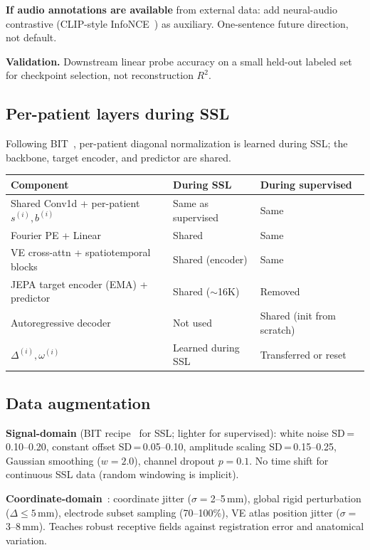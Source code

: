 \documentclass[11pt,letterpaper]{article}
\begin{document}
\textbf{If audio annotations are available} from external data: add neural-audio contrastive (CLIP-style InfoNCE~\cite{antoniades2024}) as auxiliary. One-sentence future direction, not default.

\textbf{Validation.} Downstream linear probe accuracy on a small held-out labeled set for checkpoint selection, not reconstruction $R^2$.

\subsection{Per-patient layers during SSL}

Following BIT~\cite{zhang2026bit}, per-patient diagonal normalization is learned during SSL; the backbone, target encoder, and predictor are shared.

\begin{table}[ht!]\centering\small
\begin{tabular}{@{}lll@{}}
\toprule
\textbf{Component} & \textbf{During SSL} & \textbf{During supervised} \\
\midrule
Shared Conv1d + per-patient $s^{(i)}, b^{(i)}$ & Same as supervised & Same \\
Fourier PE + Linear & Shared & Same \\
VE cross-attn + spatiotemporal blocks & Shared (encoder) & Same \\
JEPA target encoder (EMA) + predictor & Shared (${\sim}$16K) & Removed \\
Autoregressive decoder & Not used & Shared (init from scratch) \\
$\Delta^{(i)}, \omega^{(i)}$ & Learned during SSL & Transferred or reset \\
\bottomrule
\end{tabular}
\end{table}

\subsection{Data augmentation}\label{sec:augmentation}

\textbf{Signal-domain} (BIT recipe~\cite{zhang2026bit} for SSL; lighter for supervised): white noise SD\,=\,0.10--0.20, constant offset SD\,=\,0.05--0.10, amplitude scaling SD\,=\,0.15--0.25, Gaussian smoothing ($w{=}2.0$), channel dropout $p{=}0.1$. No time shift for continuous SSL data (random windowing is implicit).

\textbf{Coordinate-domain}~\cite{hewitt2024}: coordinate jitter ($\sigma{=}$2--5\,mm), global rigid perturbation ($\Delta \leq 5$\,mm), electrode subset sampling (70--100\%), VE atlas position jitter ($\sigma{=}$3--8\,mm). Teaches robust receptive fields against registration error and anatomical variation.
\end{document}
